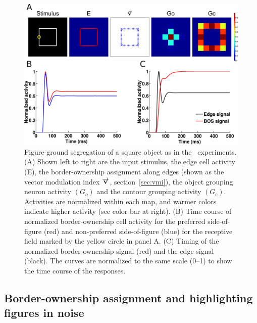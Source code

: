 \begin{figure}[t!]
\centering
\includegraphics[width=\textwidth]{Contour/figs/Fig6.eps}
\makeatletter
\let\@currsize\normalsize
\caption[Time course of figure-ground segregation]{Figure-ground segregation of a square object as in the~\citet{Zhou_etal00} experiments. (A) Shown left to right are the input stimulus, the edge cell activity (E), the border-ownership assignment along edges (shown as the vector modulation index $\protect\overrightarrow{\mathbf{v}}$, section~\ref{sec:vmi}), the object grouping neuron activity $(G_o)$ and the contour grouping activity $(G_c)$. Activities are normalized within each map, and warmer colors indicate higher activity (see color bar at right). (B) Time course of normalized border-ownership cell activity for the preferred side-of-figure (red) and non-preferred side-of-figure (blue) for the receptive field marked by the yellow circle in panel A.
(C) Timing of the  normalized border-ownership signal (red) and the edge signal (black).
The curves are normalized to the same scale (0--1) to show the time course of the responses.}
\label{Fig:BOS_timecourse}
\end{figure}

\subsection{Border-ownership assignment and highlighting figures in noise}
\label{sec:BOS}

